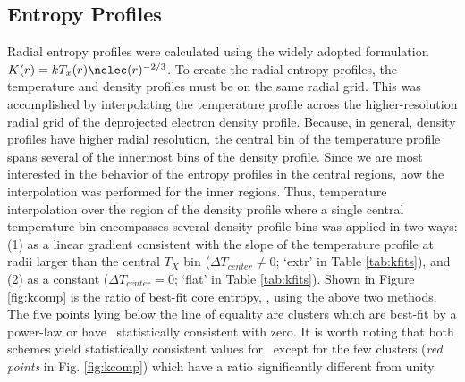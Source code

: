 \subsection{Entropy Profiles}
\label{sec:entsuppkpr}

Radial entropy profiles were calculated using the widely adopted
formulation $K(r) = kT_x(r)\nelec(r)^{-2/3}$. To create the radial
entropy profiles, the temperature and density profiles must be on the
same radial grid. This was accomplished by interpolating the
temperature profile across the higher-resolution radial grid of the
deprojected electron density profile. Because, in general, density
profiles have higher radial resolution, the central bin of the
temperature profile spans several of the innermost bins of the density
profile. Since we are most interested in the behavior of the entropy
profiles in the central regions, how the interpolation was performed
for the inner regions. Thus, temperature interpolation over the region
of the density profile where a single central temperature bin
encompasses several density profile bins was applied in two ways: (1)
as a linear gradient consistent with the slope of the temperature
profile at radii larger than the central $T_X$ bin ($\Delta T_{center}
\ne 0$; `extr' in Table \ref{tab:kfits}), and (2) as a constant
($\Delta T_{center}=0$; `flat' in Table \ref{tab:kfits}). Shown in
Figure \ref{fig:kcomp} is the ratio of best-fit core entropy, \kna,
using the above two methods. The five points lying below the line of
equality are clusters which are best-fit by a power-law or have
\kna\ statistically consistent with zero. It is worth noting that both
schemes yield statistically consistent values for \kna\ except for the
few clusters ({\it{red points}} in Fig. \ref{fig:kcomp}) which have a
ratio significantly different from unity.

